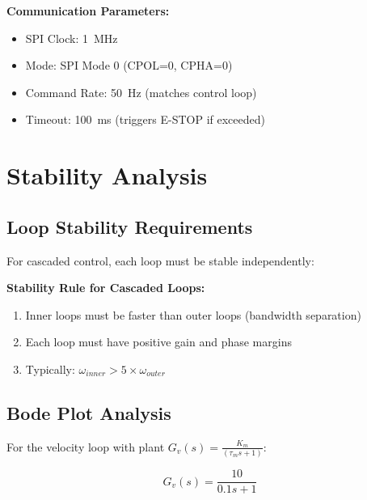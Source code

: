 \documentclass[11pt,letterpaper]{article}
\begin{document}
\begin{ournumbers}
\textbf{Communication Parameters:}
\begin{itemize}[noitemsep]
    \item SPI Clock: \SI{1}{\mega\hertz}
    \item Mode: SPI Mode 0 (CPOL=0, CPHA=0)
    \item Command Rate: \SI{50}{\hertz} (matches control loop)
    \item Timeout: \SI{100}{\milli\second} (triggers E-STOP if exceeded)
\end{itemize}
\end{ournumbers}

\newpage
\section{Stability Analysis}

\subsection{Loop Stability Requirements}

For cascaded control, each loop must be stable independently:

\begin{keypoint}
\textbf{Stability Rule for Cascaded Loops:}
\begin{enumerate}
    \item Inner loops must be faster than outer loops (bandwidth separation)
    \item Each loop must have positive gain and phase margins
    \item Typically: $\omega_{inner} > 5 \times \omega_{outer}$
\end{enumerate}
\end{keypoint}

\subsection{Bode Plot Analysis}

For the velocity loop with plant $G_v(s) = \frac{K_m}{(\tau_m s + 1)}$:

\begin{equation}
G_v(s) = \frac{10}{0.1s + 1}
\end{equation}
\end{document}
